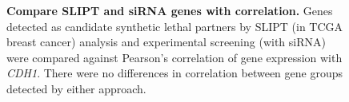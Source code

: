 \begin{figure}[!htp]
\begin{center}
   \end{center}
   \caption[Compare SLIPT and \gls{siRNA} genes with correlation]{\small \textbf{Compare \gls{SLIPT} and \gls{siRNA} genes with correlation.} Genes detected as candidate \gls{synthetic lethal} partners by \gls{SLIPT} (in \gls{TCGA} breast cancer)  analysis and experimental screening (with \gls{siRNA}) were compared against Pearson's correlation of \gls{gene expression} with \textit{CDH1}. There were no differences in correlation between gene groups detected by either approach. 
}
\label{fig:compare_correlation_SL}
\end{figure}

